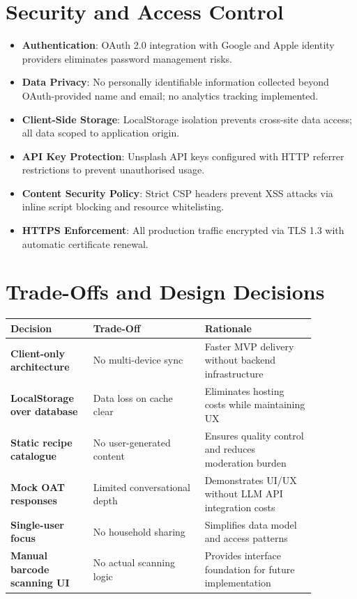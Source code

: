\documentclass[12pt]{article}
\begin{document}
\section{Security and Access Control}
\begin{itemize}
  \item \textbf{Authentication}: OAuth 2.0 integration with Google and Apple identity providers eliminates password management risks.
  \item \textbf{Data Privacy}: No personally identifiable information collected beyond OAuth-provided name and email; no analytics tracking implemented.
  \item \textbf{Client-Side Storage}: LocalStorage isolation prevents cross-site data access; all data scoped to application origin.
  \item \textbf{API Key Protection}: Unsplash API keys configured with HTTP referrer restrictions to prevent unauthorised usage.
  \item \textbf{Content Security Policy}: Strict CSP headers prevent XSS attacks via inline script blocking and resource whitelisting.
  \item \textbf{HTTPS Enforcement}: All production traffic encrypted via TLS 1.3 with automatic certificate renewal.
\end{itemize}

\section{Trade-Offs and Design Decisions}
\begin{center}
\begin{tabular}{>{\bfseries}p{0.23\linewidth} p{0.32\linewidth} p{0.32\linewidth}}
\toprule
Decision & Trade-Off & Rationale \\
\midrule
Client-only architecture & No multi-device sync & Faster MVP delivery without backend infrastructure \\
LocalStorage over database & Data loss on cache clear & Eliminates hosting costs while maintaining UX \\
Static recipe catalogue & No user-generated content & Ensures quality control and reduces moderation burden \\
Mock OAT responses & Limited conversational depth & Demonstrates UI/UX without LLM API integration costs \\
Single-user focus & No household sharing & Simplifies data model and access patterns \\
Manual barcode scanning UI & No actual scanning logic & Provides interface foundation for future implementation \\
\bottomrule
\end{tabular}
\end{center}
\end{document}
